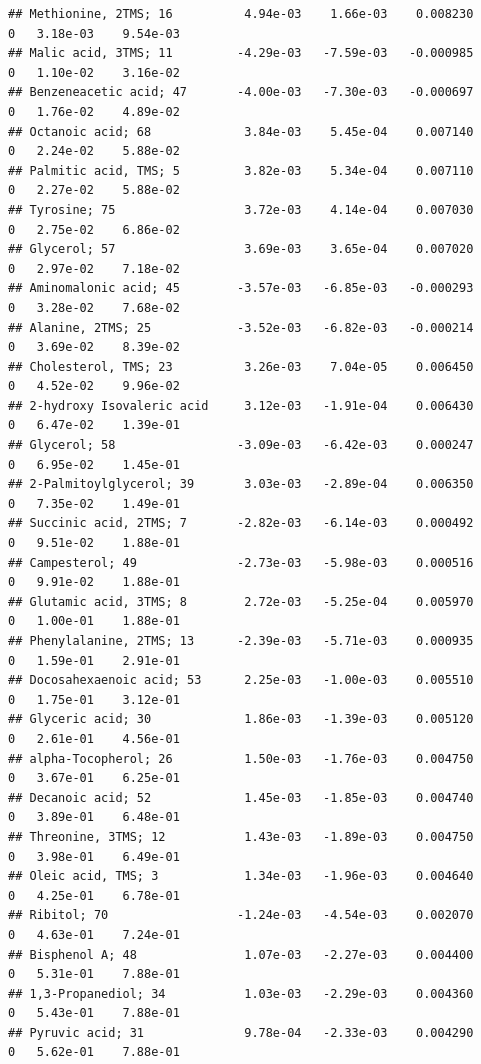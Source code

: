 \documentclass[]{article}
\begin{document}
\begin{verbatim}
## Methionine, 2TMS; 16          4.94e-03    1.66e-03    0.008230         0   3.18e-03    9.54e-03
## Malic acid, 3TMS; 11         -4.29e-03   -7.59e-03   -0.000985         0   1.10e-02    3.16e-02
## Benzeneacetic acid; 47       -4.00e-03   -7.30e-03   -0.000697         0   1.76e-02    4.89e-02
## Octanoic acid; 68             3.84e-03    5.45e-04    0.007140         0   2.24e-02    5.88e-02
## Palmitic acid, TMS; 5         3.82e-03    5.34e-04    0.007110         0   2.27e-02    5.88e-02
## Tyrosine; 75                  3.72e-03    4.14e-04    0.007030         0   2.75e-02    6.86e-02
## Glycerol; 57                  3.69e-03    3.65e-04    0.007020         0   2.97e-02    7.18e-02
## Aminomalonic acid; 45        -3.57e-03   -6.85e-03   -0.000293         0   3.28e-02    7.68e-02
## Alanine, 2TMS; 25            -3.52e-03   -6.82e-03   -0.000214         0   3.69e-02    8.39e-02
## Cholesterol, TMS; 23          3.26e-03    7.04e-05    0.006450         0   4.52e-02    9.96e-02
## 2-hydroxy Isovaleric acid     3.12e-03   -1.91e-04    0.006430         0   6.47e-02    1.39e-01
## Glycerol; 58                 -3.09e-03   -6.42e-03    0.000247         0   6.95e-02    1.45e-01
## 2-Palmitoylglycerol; 39       3.03e-03   -2.89e-04    0.006350         0   7.35e-02    1.49e-01
## Succinic acid, 2TMS; 7       -2.82e-03   -6.14e-03    0.000492         0   9.51e-02    1.88e-01
## Campesterol; 49              -2.73e-03   -5.98e-03    0.000516         0   9.91e-02    1.88e-01
## Glutamic acid, 3TMS; 8        2.72e-03   -5.25e-04    0.005970         0   1.00e-01    1.88e-01
## Phenylalanine, 2TMS; 13      -2.39e-03   -5.71e-03    0.000935         0   1.59e-01    2.91e-01
## Docosahexaenoic acid; 53      2.25e-03   -1.00e-03    0.005510         0   1.75e-01    3.12e-01
## Glyceric acid; 30             1.86e-03   -1.39e-03    0.005120         0   2.61e-01    4.56e-01
## alpha-Tocopherol; 26          1.50e-03   -1.76e-03    0.004750         0   3.67e-01    6.25e-01
## Decanoic acid; 52             1.45e-03   -1.85e-03    0.004740         0   3.89e-01    6.48e-01
## Threonine, 3TMS; 12           1.43e-03   -1.89e-03    0.004750         0   3.98e-01    6.49e-01
## Oleic acid, TMS; 3            1.34e-03   -1.96e-03    0.004640         0   4.25e-01    6.78e-01
## Ribitol; 70                  -1.24e-03   -4.54e-03    0.002070         0   4.63e-01    7.24e-01
## Bisphenol A; 48               1.07e-03   -2.27e-03    0.004400         0   5.31e-01    7.88e-01
## 1,3-Propanediol; 34           1.03e-03   -2.29e-03    0.004360         0   5.43e-01    7.88e-01
## Pyruvic acid; 31              9.78e-04   -2.33e-03    0.004290         0   5.62e-01    7.88e-01

\end{verbatim}
\end{document}
